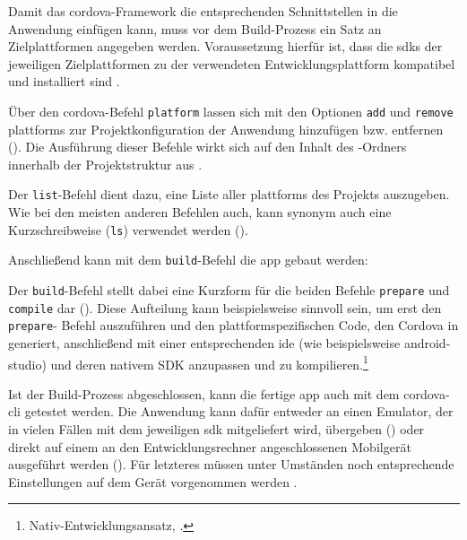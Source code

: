 {Damit das \gls{cordova}-Framework die entsprechenden Schnittstellen in die Anwendung einfügen kann, muss vor dem Build-Prozess ein Satz an Zielplattformen angegeben werden. 
Voraussetzung hierfür ist, dass die \glspl{sdk} der jeweiligen Zielplattformen zu der verwendeten Entwicklungsplattform kompatibel und installiert sind \cite{Cordova-Docs_CLI}.

Über den \gls{cordova}-Befehl \lstinline|platform| lassen sich mit den Optionen \lstinline|add| und \lstinline|remove| \glspl{plattform} zur Projektkonfiguration der Anwendung hinzufügen bzw. entfernen ().
Die Ausführung dieser Befehle wirkt sich auf den Inhalt des -Ordners innerhalb der Projektstruktur aus \cite{Cordova-Docs_CLI}.


Der \lstinline|list|-Befehl dient dazu, eine Liste aller \glspl{plattform} des Projekts auszugeben. Wie bei den meisten anderen Befehlen auch, kann synonym auch eine Kurzschreibweise (\lstinline|ls|) verwendet werden ().


Anschließend kann mit dem \lstinline|build|-Befehl die \gls{app} gebaut werden:


Der \lstinline|build|-Befehl stellt dabei eine Kurzform für die beiden Befehle \lstinline|prepare| und  \lstinline|compile| dar ().
Diese Aufteilung kann beispielsweise sinnvoll sein, um erst den \lstinline|prepare|- Befehl auszuführen und den plattformspezifischen Code, den Cordova in  generiert, anschließend mit einer entsprechenden \gls{ide} (wie beispielsweise \gls{android-studio}) und deren nativem SDK anzupassen und zu kompilieren.\footnote{\vgl Nativ-Entwicklungsansatz, \so.}




Ist der Build-Prozess abgeschlossen, kann die fertige \gls{app} auch mit dem \gls{cordova}-\gls{cli} getestet werden. 
Die Anwendung kann dafür entweder an einen Emulator, der in vielen Fällen mit dem jeweiligen \gls{sdk} mitgeliefert wird, übergeben () oder direkt auf einem an den Entwicklungsrechner angeschlossenen Mobilgerät ausgeführt werden ().
Für letzteres müssen unter Umständen noch entsprechende Einstellungen auf dem Gerät vorgenommen werden \cite{Cordova-Docs_CLI}.

}

